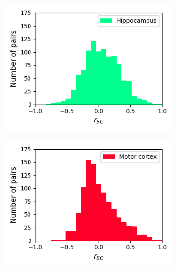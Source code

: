 \documentclass[a4paper,12pt]{article}
\theoremstyle{definition}
\begin{document}
\begin{figure}[p]
  \begin{subfigure}{0.5\textwidth}
    \centering
    \includegraphics[width=\textwidth]{figures/all_hippocampus_8_1p0_correlation_histogram.png}
  \end{subfigure}
  \begin{subfigure}{0.5\textwidth}
    \centering
    \includegraphics[width=\textwidth]{figures/all_motor_cortex_8_1p0_correlation_histogram.png}
  \end{subfigure}
  \begin{subfigure}{0.5\textwidth}
    \centering

\end{subfigure}
\end{figure}
\end{document}
